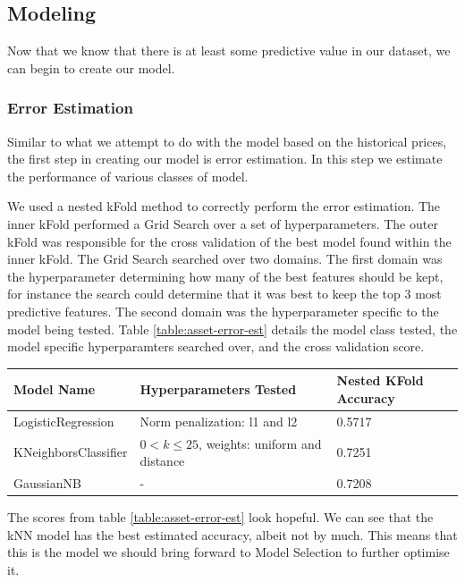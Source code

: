 \documentclass{report}
\begin{document}
\subsection{Modeling}

Now that we know that there is at least some predictive value in our dataset, we can begin to create our model.

\subsubsection{Error Estimation}

Similar to what we attempt to do with the model based on the historical prices, the first step in creating our model is error estimation. In this step we estimate the performance of various classes of model.

We used a nested kFold method to correctly perform the error estimation. The inner kFold performed a Grid Search over a set of hyperparameters.  The outer kFold was responsible for the cross validation of the best model found within the inner kFold. The Grid Search searched over two domains. The first domain was the hyperparameter determining how many of the best features should be kept, for instance the search could determine that it was best to keep the top 3 most predictive features. The second domain was the hyperparameter specific to the model being tested. Table \ref{table:asset-error-est} details the model class tested, the model specific hyperparamters searched over, and the cross validation score.

\begin{center}
  
  \begin{tabular}{l | l | l}
	  Model Name & Hyperparameters Tested & Nested KFold Accuracy \\ \hline
	  LogisticRegression & Norm penalization: l1 and l2 & 0.5717 \\ \hline
	  KNeighborsClassifier & $0 < k \leq 25$, weights: uniform and distance & 0.7251 \\ \hline
	  GaussianNB & - & 0.7208
	  \label{table:asset-error-est}
  \end{tabular}
\end{center}

The scores from table \ref{table:asset-error-est} look hopeful. We can see that the kNN model has the best estimated accuracy, albeit not by much. This means that this is the model we should bring forward to Model Selection to further optimise it.
\end{document}
